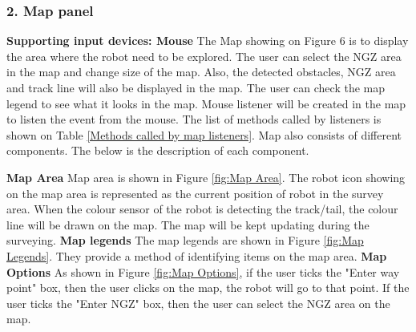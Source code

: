 \subsubsection{2. Map panel}
\textbf{Supporting input devices: Mouse}
The Map showing on Figure 6 is to display the area where the robot need to be explored. The user can select the NGZ area in the map and change size of the map. Also, the detected obstacles, NGZ area and track line will also be displayed in the map. The user can check the map legend to see what it looks in the map. Mouse listener will be created in the map to listen the event from the mouse. The list of methods called by listeners is shown on Table \ref{Methods called by map listeners}. Map also consists of different components. The below is the description of each component.

\textbf{Map Area}
Map area is shown in Figure \ref{fig:Map Area}. The robot icon showing on the map area is represented as the current position of robot in the survey area. When the colour sensor of the robot is detecting the track/tail, the colour line will be drawn on the map. The map will be kept updating during the surveying.
\textbf{Map legends}  
The map legends are shown in Figure \ref{fig:Map Legends}. They provide a method of identifying items on the map area.
\textbf{Map Options}
As shown in Figure \ref{fig:Map Options}, if the user ticks the "Enter way point" box, then the user clicks on the map, the robot will go to that point. If the user ticks the "Enter NGZ" box, then the user can select the NGZ area on the map.
	
